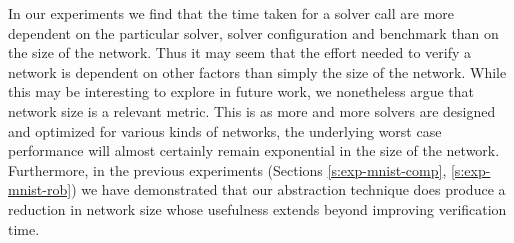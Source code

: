 In our experiments we find that the time taken for a solver call are more
dependent on the particular solver, solver configuration and benchmark than on
the size of the network. Thus it may seem that the effort needed to verify a
network is dependent on other factors than simply the size of the network. While
this may be interesting to explore in future work, we nonetheless argue that
network size is a relevant metric. This is as more and more solvers are designed
and optimized for various kinds of networks, the underlying worst case
performance will almost certainly remain exponential in the size of the network.
Furthermore, in the previous experiments (Sections \ref{s:exp-mnist-comp},
\ref{s:exp-mnist-rob}) we have demonstrated that our abstraction technique does
produce a reduction in network size whose usefulness extends beyond improving
verification time. 


